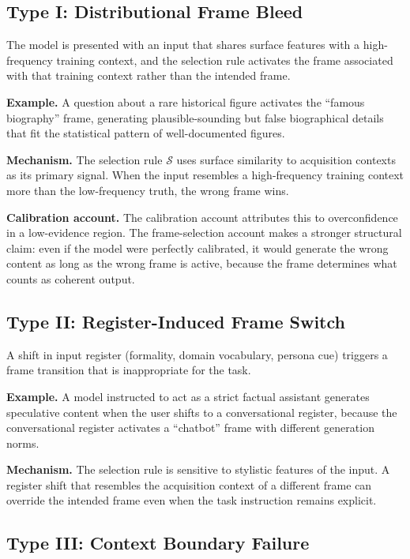 \documentclass[12pt]{article}
\begin{document}
\subsection{Type I: Distributional Frame Bleed}

The model is presented with an input that shares surface features
with a high-frequency training context, and the selection rule
activates the frame associated with that training context rather than
the intended frame.

\textbf{Example.} A question about a rare historical figure activates
the ``famous biography'' frame, generating plausible-sounding but
false biographical details that fit the statistical pattern of
well-documented figures.

\textbf{Mechanism.} The selection rule $\mathcal{S}$ uses surface
similarity to acquisition contexts as its primary signal. When the
input resembles a high-frequency training context more than the
low-frequency truth, the wrong frame wins.

\textbf{Calibration account.} The calibration account attributes
this to overconfidence in a low-evidence region. The frame-selection
account makes a stronger structural claim: even if the model were
perfectly calibrated, it would generate the wrong content as long
as the wrong frame is active, because the frame determines what
counts as coherent output.

\subsection{Type II: Register-Induced Frame Switch}

A shift in input register (formality, domain vocabulary, persona
cue) triggers a frame transition that is inappropriate for the
task.

\textbf{Example.} A model instructed to act as a strict factual
assistant generates speculative content when the user shifts to
a conversational register, because the conversational register
activates a ``chatbot'' frame with different generation norms.

\textbf{Mechanism.} The selection rule is sensitive to stylistic
features of the input. A register shift that resembles the
acquisition context of a different frame can override the intended
frame even when the task instruction remains explicit.

\subsection{Type III: Context Boundary Failure}
\end{document}
